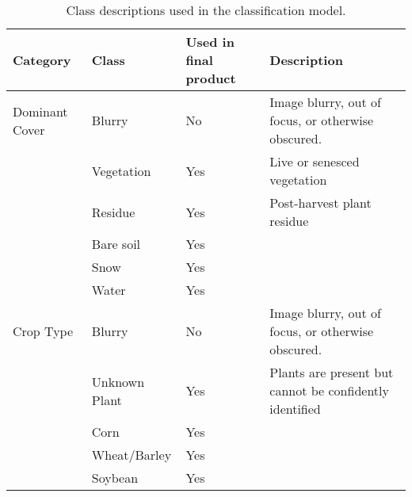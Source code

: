 \documentclass[remotesensing,article,submit,moreauthors,pdftex]{Definitions/mdpi}
\begin{document}
\begin{table}[H]
\caption{Class descriptions used in the classification model.}
\begin{tabular}{|p{2cm}|p{3cm}|p{2cm}|p{5cm}|}
\hline
Category       & Class              & Used in final product & Description                                                                                          \\ \hline
Dominant Cover & Blurry             & No                    & Image blurry, out of focus, or otherwise obscured.                                                   \\ \hline
               & Vegetation         & Yes                   & Live or senesced vegetation                                                                          \\ \hline
               & Residue            & Yes                   & Post-harvest plant residue                                                                           \\ \hline
               & Bare soil          & Yes                   &                                                                                                      \\ \hline
               & Snow               & Yes                   &                                                                                                      \\ \hline
               & Water              & Yes                   &                                                                                                      \\ \hline
Crop Type      & Blurry             & No                    & Image blurry, out of focus, or otherwise obscured.                                                   \\ \hline
               & Unknown Plant      & Yes                   & Plants are present but cannot be confidently identified                                              \\ \hline
               & Corn               & Yes                   &                                                                                                      \\ \hline
               & Wheat/Barley       & Yes                   &                                                                                                      \\ \hline
               & Soybean            & Yes                   &                                                                                                      \\ \hline

\end{tabular}
\end{table}
\end{document}
